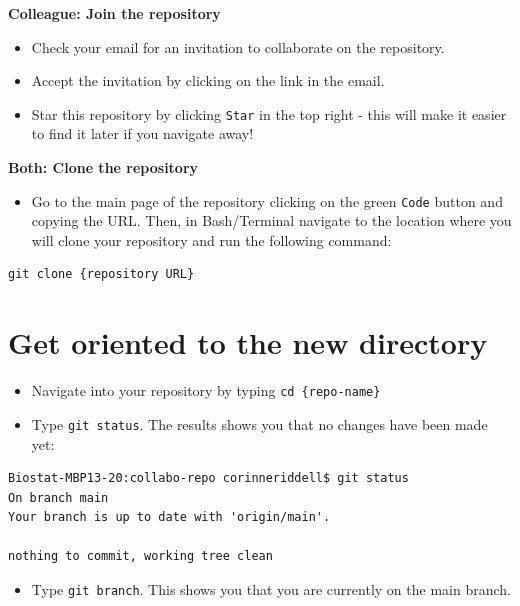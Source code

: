 \documentclass[
]{book}
\providecommand{\tightlist}{%
  \setlength{\itemsep}{0pt}\setlength{\parskip}{0pt}}
\begin{document}
\textbf{Colleague: Join the repository}

\begin{itemize}
\tightlist
\item
  Check your email for an invitation to collaborate on the repository.
\item
  Accept the invitation by clicking on the link in the email.
\item
  Star this repository by clicking \texttt{Star} in the top right - this will make it easier to find it later if you navigate away!
\end{itemize}

\textbf{Both: Clone the repository}

\begin{itemize}
\tightlist
\item
  Go to the main page of the repository clicking on the green \texttt{Code} button and
  copying the URL. Then, in Bash/Terminal navigate to the location where you will
  clone your repository and run the following command:
\end{itemize}

\begin{verbatim}
git clone {repository URL}
\end{verbatim}

\section{Get oriented to the new directory}\label{get-oriented-to-the-new-directory}

\begin{itemize}
\tightlist
\item
  Navigate into your repository by typing \texttt{cd\ \{repo-name\}}
\item
  Type \texttt{git\ status}. The results shows you that no changes have been made yet:
\end{itemize}

\begin{verbatim}
Biostat-MBP13-20:collabo-repo corinneriddell$ git status
On branch main
Your branch is up to date with 'origin/main'.

nothing to commit, working tree clean
\end{verbatim}

\begin{itemize}
\tightlist
\item
  Type \texttt{git\ branch}. This shows you that you are currently on the main branch.
\end{itemize}
\end{document}
